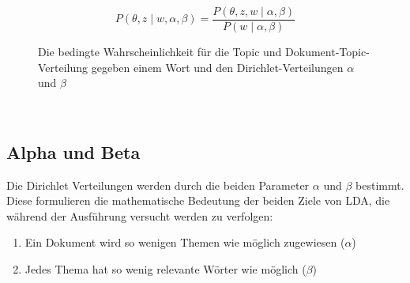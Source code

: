 \documentclass[german,version-2020-11]{uzl-thesis}
\begin{document}
\begin{figure}[h]
\begin{center}
\begin{equation}
P(\theta, z \mid w, \alpha, \beta) = \frac{P(\theta, z, w \mid \alpha, \beta)}{P(w \mid \alpha, \beta)}
\end{equation}
\end{center}
\caption{Die bedingte Wahrscheinlichkeit für die Topic und Dokument-Topic-Verteilung gegeben einem Wort und den Dirichlet-Verteilungen $\alpha$ und $\beta$}
\label{fig:equ2}
\end{figure}\\


\subsection{Alpha und Beta}
Die Dirichlet Verteilungen werden durch die beiden Parameter $\alpha$ und $\beta$ bestimmt. Diese formulieren die mathematische Bedeutung der beiden Ziele von LDA, die während der Ausführung versucht werden zu verfolgen:

\begin{enumerate}
	\item Ein Dokument wird so wenigen Themen wie möglich zugewiesen ($\alpha$)
	\item Jedes Thema hat so wenig relevante Wörter wie möglich ($\beta$)
\end{enumerate}
\end{document}
